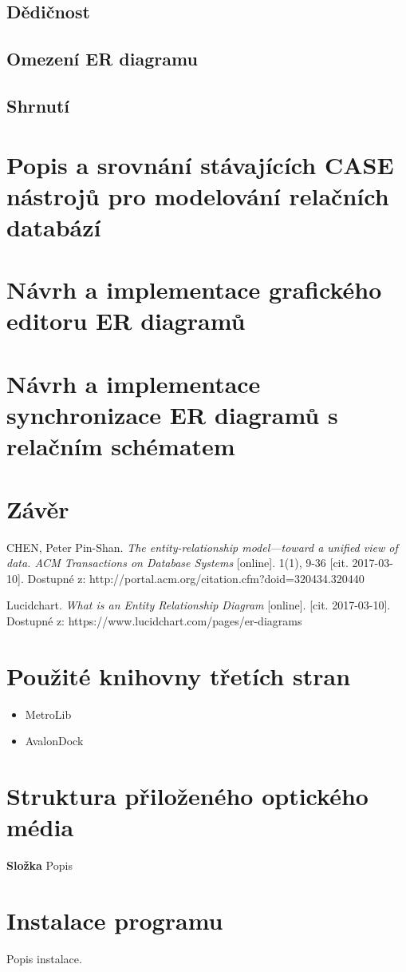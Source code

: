 \documentclass[czech,bachelor,public,dept460,male,oneside]{diploma}
\begin{document}
	\subsection{Dědičnost} %
	
	\subsection{Omezení ER diagramu}
	
	\subsection{Shrnutí}

\newpage
\section{Popis a srovnání stávajících CASE nástrojů pro modelování relačních databází}

\newpage
\section{Návrh a implementace grafického editoru ER diagramů}

\newpage
\section{Návrh a implementace synchronizace ER diagramů s relačním schématem}

\newpage
\section{Závěr}

\newpage

\begin{thebibliography}{99}
	 CHEN, Peter Pin-Shan. \textit{The entity-relationship model---toward a unified view of data. ACM Transactions on Database Systems} [online]. 1(1), 9-36 [cit. 2017-03-10]. Dostupné z: http://portal.acm.org/citation.cfm?doid=320434.320440
	
	Lucidchart. \textit{What is an Entity Relationship Diagram} [online]. [cit. 2017-03-10]. Dostupné z: https://www.lucidchart.com/pages/er-diagrams
\end{thebibliography}


\appendix
\section{Použité knihovny třetích stran}
\begin{itemize}
	\item MetroLib
	\item AvalonDock
\end{itemize}

\section{Struktura přiloženého optického média}
\textbf{Složka} Popis

\section{Instalace programu}
Popis instalace.
\end{document}
